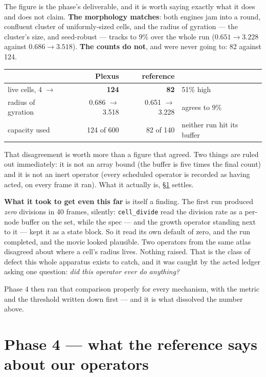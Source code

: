 \documentclass[11pt,a4paper]{article}
\newcommand{\code}[1]{\texttt{#1}}
\begin{document}
The figure is the phase's deliverable, and it is worth saying exactly what it does and does not
claim. \textbf{The morphology matches}: both engines jam into a round, confluent cluster of
uniformly-sized cells, and the radius of gyration --- the cluster's size, and seed-robust ---
tracks to 9\% over the whole run ($0.651 \to 3.228$ against $0.686 \to 3.518$). \textbf{The counts
do not}, and were never going to: 82 against 124.

\begin{center}
\small
\begin{tabular}{@{}l r r l@{}}
\toprule
& \textbf{Plexus} & \textbf{reference} & \\
\midrule
live cells, 4 $\to$ & \textbf{124} & \textbf{82} & \textcolor{bad}{51\% high}\\
radius of gyration & 0.686 $\to$ 3.518 & 0.651 $\to$ 3.228 & agrees to 9\%\\
capacity used & 124 of 600 & 82 of 140 & neither run hit its buffer\\
\bottomrule
\end{tabular}
\end{center}

That disagreement is worth more than a figure that agreed. Two things are ruled out immediately:
it is not an array bound (the buffer is five times the final count) and it is not an inert
operator (every scheduled operator is recorded as having acted, on every frame it ran). What it
actually is, \S\ref{sec:p4} settles.

\textbf{What it took to get even this far} is itself a finding. The first run produced
\emph{zero} divisions in 40 frames, silently: \code{cell\_divide} read the division rate as a
per-node buffer on the set, while the spec --- and the growth operator standing next to it --- kept
it as a state block. So it read its own default of zero, and the run completed, and the movie looked plausible.
Two operators from the same atlas disagreed about where a cell's radius lives. Nothing raised.
That is the class of defect this whole apparatus exists to catch, and it was caught by the acted
ledger asking one question: \emph{did this operator ever do anything?}

Phase 4 then ran that comparison properly for every mechanism, with the metric and the threshold
written down first --- and it is what dissolved the number above.

\section{Phase 4 --- what the reference says about our operators}\label{sec:p4}
\end{document}
